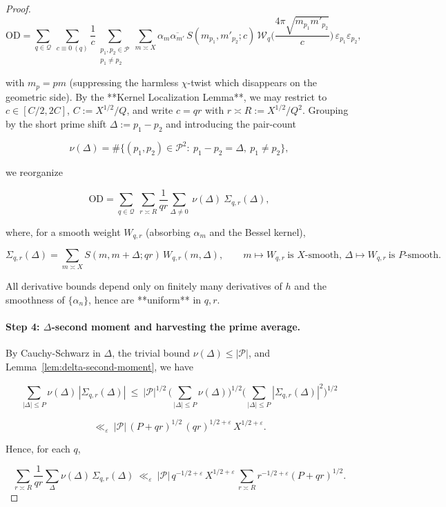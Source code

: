 \documentclass[11pt]{article}
\theoremstyle{definition}
\theoremstyle{remark}
\begin{document}
\begin{proof}
	$$
		\mathrm{OD}
		=\sum_{q\in\mathcal Q}\ \sum_{c\equiv 0\ (q)} \frac{1}{c}\!
		\sum_{\substack{p_1,p_2\in\mathcal P\\ p_1\ne p_2}}\!
		\sum_{m\asymp X} \alpha_m\overline{\alpha_{m'}}\,
		S(m_{p_1},m'_{p_2};c)\,
		\mathcal W_q\!\Big(\frac{4\pi\sqrt{m_{p_1}m'_{p_2}}}{c}\Big)\,
		\varepsilon_{p_1}\varepsilon_{p_2},
	$$

	with $m_{p}=pm$ (suppressing the harmless $\chi$-twist which disappears on the geometric side). By the **Kernel Localization Lemma**, we may restrict to $c\in[C/2,2C]$, $C:=X^{1/2}/Q$, and write $c=qr$ with $r\asymp R:=X^{1/2}/Q^2$. Grouping by the short prime shift $\Delta:=p_1-p_2$ and introducing the pair-count

	$$
		\nu(\Delta)=\#\{(p_1,p_2)\in\mathcal P^2:\ p_1-p_2=\Delta,\ p_1\ne p_2\},
	$$

	we reorganize

	$$
		\mathrm{OD}
		=\sum_{q\in\mathcal Q}\ \sum_{r\asymp R} \frac{1}{qr}
		\sum_{\Delta\ne 0}\ \nu(\Delta)\ \Sigma_{q,r}(\Delta),
	$$

	where, for a smooth weight $W_{q,r}$ (absorbing $\alpha_m$ and the Bessel kernel),

	$$
		\Sigma_{q,r}(\Delta)=\sum_{m\asymp X} S(m,m+\Delta;qr)\,W_{q,r}(m,\Delta),
		\qquad m\mapsto W_{q,r}\ \text{is }X\text{-smooth,\ } \Delta\mapsto W_{q,r}\ \text{is }P\text{-smooth}.
	$$

	All derivative bounds depend only on finitely many derivatives of $h$ and the smoothness of $\{\alpha_n\}$, hence are **uniform** in $q,r$.

	\paragraph{Step 4: $\Delta$-second moment and harvesting the prime average.}

	By Cauchy-Schwarz in $\Delta$, the trivial bound $\nu(\Delta)\le |\mathcal P|$, and Lemma~\ref{lem:delta-second-moment}, we have

	$$
		\sum_{|\Delta|\le P}\nu(\Delta)\,|\Sigma_{q,r}(\Delta)|
		\ \le\ |\mathcal P|^{1/2}\,\Big(\sum_{|\Delta|\le P}\nu(\Delta)\Big)^{1/2}
		\Big(\sum_{|\Delta|\le P}|\Sigma_{q,r}(\Delta)|^2\Big)^{1/2}
	$$

	$$
		\ll_\varepsilon\ |\mathcal P|\,(P+qr)^{1/2}\,(qr)^{1/2+\varepsilon}\,X^{1/2+\varepsilon}.
	$$

	Hence, for each $q$,

	$$
		\sum_{r\asymp R}\frac{1}{qr}\sum_{\Delta}\nu(\Delta)\,\Sigma_{q,r}(\Delta)
		\ \ll_\varepsilon\ |\mathcal P|\,q^{-1/2+\varepsilon}\,X^{1/2+\varepsilon}\,
		\sum_{r\asymp R} r^{-1/2+\varepsilon}(P+qr)^{1/2}.
	$$


\end{proof}
\end{document}
